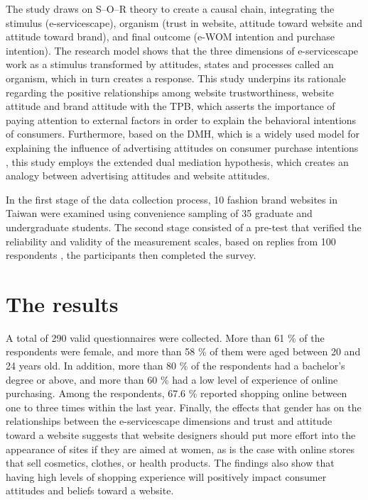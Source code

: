\documentclass[a4paper]{article}
\begin{document}
The study draws on S–O–R theory to create a causal chain, integrating the stimulus (e-servicescape), organism (trust in website, attitude toward website and attitude toward brand), and final outcome (e-WOM intention and purchase intention). The research model shows that the three dimensions of e-servicescape work as a stimulus transformed by attitudes, states and processes called an organism, which in turn creates a response. This study underpins its rationale regarding the positive relationships among website trustworthiness, website attitude and brand attitude with the TPB, which asserts the importance of paying attention to external factors in order to explain the behavioral intentions of consumers. Furthermore, based on the DMH, which is a widely used model for explaining the influence of advertising attitudes on consumer purchase intentions , this study employs the extended dual mediation hypothesis, which creates an analogy between advertising attitudes and website attitudes. 

In the first stage of the data collection process, 10 fashion brand websites in Taiwan were examined using convenience sampling of 35 graduate and undergraduate students. The second stage consisted of a pre-test that verified the reliability and validity of the measurement scales, based on replies from 100 respondents , the participants then completed the survey.


\section{The results}
 
A total of 290 valid questionnaires were collected. More than 61 \% of the respondents were female, and more than 58 \% of them were aged between 20 and 24 years old. In addition, more than 80 \% of the respondents had a bachelor’s degree or above, and more than 60 \% had a low level of experience of online purchasing. Among the respondents, 67.6 \% reported shopping online between one to three times within the last year. Finally, the effects that gender has on the relationships between the e-servicescape dimensions and trust and attitude toward a website suggests that website designers should put more effort into the appearance of sites if they are aimed at women, as is the case with online stores that sell cosmetics, clothes, or health products. The findings also show that having high levels of shopping experience will positively impact consumer attitudes and beliefs toward a website. 
\end{document}
